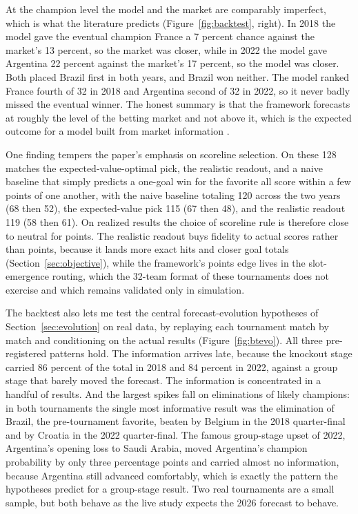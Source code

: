 \documentclass[11pt,letterpaper]{article}
\begin{document}
At the champion level the model and the market are comparably imperfect, which is what the literature predicts (Figure~\ref{fig:backtest}, right). In 2018 the model gave the eventual champion France a 7 percent chance against the market's 13 percent, so the market was closer, while in 2022 the model gave Argentina 22 percent against the market's 17 percent, so the model was closer. Both placed Brazil first in both years, and Brazil won neither. The model ranked France fourth of 32 in 2018 and Argentina second of 32 in 2022, so it never badly missed the eventual winner. The honest summary is that the framework forecasts at roughly the level of the betting market and not above it, which is the expected outcome for a model built from market information \citep{strumbelj2014, hvattum2010}.

One finding tempers the paper's emphasis on scoreline selection. On these 128 matches the expected-value-optimal pick, the realistic readout, and a naive baseline that simply predicts a one-goal win for the favorite all score within a few points of one another, with the naive baseline totaling 120 across the two years (68 then 52), the expected-value pick 115 (67 then 48), and the realistic readout 119 (58 then 61). On realized results the choice of scoreline rule is therefore close to neutral for points. The realistic readout buys fidelity to actual scores rather than points, because it lands more exact hits and closer goal totals (Section~\ref{sec:objective}), while the framework's points edge lives in the slot-emergence routing, which the 32-team format of these tournaments does not exercise and which remains validated only in simulation.

The backtest also lets me test the central forecast-evolution hypotheses of Section~\ref{sec:evolution} on real data, by replaying each tournament match by match and conditioning on the actual results (Figure~\ref{fig:btevo}). All three pre-registered patterns hold. The information arrives late, because the knockout stage carried 86 percent of the total in 2018 and 84 percent in 2022, against a group stage that barely moved the forecast. The information is concentrated in a handful of results. And the largest spikes fall on eliminations of likely champions: in both tournaments the single most informative result was the elimination of Brazil, the pre-tournament favorite, beaten by Belgium in the 2018 quarter-final and by Croatia in the 2022 quarter-final. The famous group-stage upset of 2022, Argentina's opening loss to Saudi Arabia, moved Argentina's champion probability by only three percentage points and carried almost no information, because Argentina still advanced comfortably, which is exactly the pattern the hypotheses predict for a group-stage result. Two real tournaments are a small sample, but both behave as the live study expects the 2026 forecast to behave.
\end{document}
